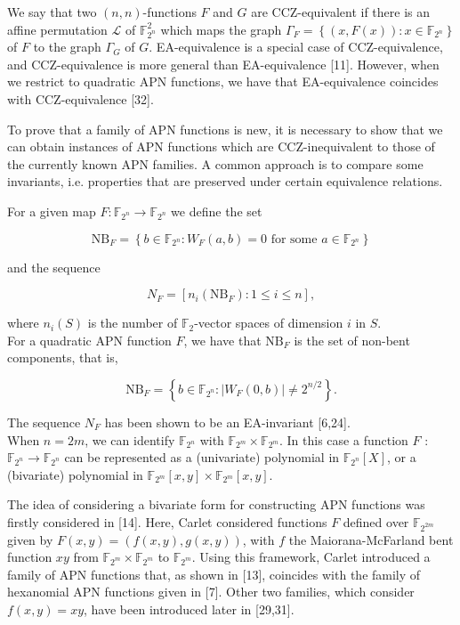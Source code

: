 \documentclass[10pt]{article}
\begin{document}
We say that two $(n, n)$-functions $F$ and $G$ are CCZ-equivalent if there is an affine permutation $\mathcal{L}$ of $\mathbb{F}_{2^{n}}^{2}$ which maps the graph $\Gamma_{F}=\left\{(x, F(x)): x \in \mathbb{F}_{2^{n}}\right\}$ of $F$ to the graph $\Gamma_{G}$ of $G$. EA-equivalence is a special case of CCZ-equivalence, and CCZ-equivalence is more general than EA-equivalence [11]. However, when we restrict to quadratic APN functions, we have that EA-equivalence coincides with CCZ-equivalence [32].

To prove that a family of APN functions is new, it is necessary to show that we can obtain instances of APN functions which are CCZ-inequivalent to those of the currently known APN families. A common approach is to compare some invariants, i.e. properties that are preserved under certain equivalence relations.

For a given map $F: \mathbb{F}_{2^{n}} \rightarrow \mathbb{F}_{2^{n}}$ we define the set

$$
\mathrm{NB}_{F}=\left\{b \in \mathbb{F}_{2^{n}}: W_{F}(a, b)=0 \text { for some } a \in \mathbb{F}_{2^{n}}\right\}
$$

and the sequence

$$
N_{F}=\left[n_{i}\left(\mathrm{NB}_{F}\right): 1 \leq i \leq n\right],
$$

where $n_{i}(S)$ is the number of $\mathbb{F}_{2}$-vector spaces of dimension $i$ in $S$.\\
For a quadratic APN function $F$, we have that $\mathrm{NB}_{F}$ is the set of non-bent components, that is,

$$
\mathrm{NB}_{F}=\left\{b \in \mathbb{F}_{2^{n}}:\left|W_{F}(0, b)\right| \neq 2^{n / 2}\right\} .
$$

The sequence $N_{F}$ has been shown to be an EA-invariant [6,24].\\
When $n=2 m$, we can identify $\mathbb{F}_{2^{n}}$ with $\mathbb{F}_{2^{m}} \times \mathbb{F}_{2^{m}}$. In this case a function $F$ : $\mathbb{F}_{2^{n}} \rightarrow \mathbb{F}_{2^{n}}$ can be represented as a (univariate) polynomial in $\mathbb{F}_{2^{n}}[X]$, or a (bivariate) polynomial in $\mathbb{F}_{2^{m}}[x, y] \times \mathbb{F}_{2^{m}}[x, y]$.

The idea of considering a bivariate form for constructing APN functions was firstly considered in [14]. Here, Carlet considered functions $F$ defined over $\mathbb{F}_{2^{2 m}}$ given by $F(x, y)=(f(x, y), g(x, y))$, with $f$ the Maiorana-McFarland bent function $x y$ from $\mathbb{F}_{2^{m}} \times \mathbb{F}_{2^{m}}$ to $\mathbb{F}_{2^{m}}$. Using this framework, Carlet introduced a family of APN functions that, as shown in [13], coincides with the family of hexanomial APN functions given in [7]. Other two families, which consider $f(x, y)=x y$, have been introduced later in [29,31].
\end{document}
